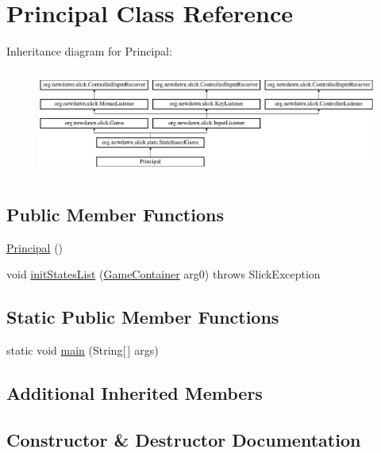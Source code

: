 \hypertarget{class_principal}{}\section{Principal Class Reference}
\label{class_principal}
Inheritance diagram for Principal\+:\begin{figure}[H]
\begin{center}
\leavevmode
\includegraphics[height=3.522012cm]{class_principal}
\end{center}
\end{figure}
\subsection*{Public Member Functions}
\begin{DoxyCompactItemize}
\item 
\mbox{\hyperlink{class_principal_a57fba8fa2eedee48e3467024e1a980da}{Principal}} ()
\item 
void \mbox{\hyperlink{class_principal_ab5582a52acd5ef67a52625e0a44ac2e9}{init\+States\+List}} (\mbox{\hyperlink{classorg_1_1newdawn_1_1slick_1_1_game_container}{Game\+Container}} arg0)  throws Slick\+Exception
\end{DoxyCompactItemize}
\subsection*{Static Public Member Functions}
\begin{DoxyCompactItemize}
\item 
static void \mbox{\hyperlink{class_principal_a122f5159f9c20dc1ac51d94a71dde7a5}{main}} (String\mbox{[}$\,$\mbox{]} args)
\end{DoxyCompactItemize}
\subsection*{Additional Inherited Members}


\subsection{Constructor \& Destructor Documentation}
\mbox{\label{class_principal_a57fba8fa2eedee48e3467024e1a980da}} 
